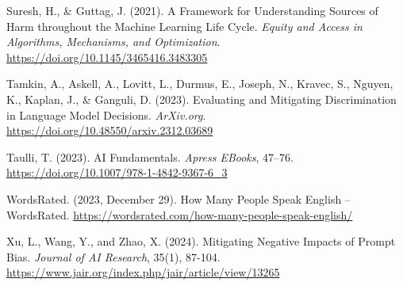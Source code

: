 \documentclass[11pt,twocolumn]{article}
\begin{document}
\begin{thebibliography}{}
Suresh, H., & Guttag, J. (2021).
\newblock A Framework for Understanding Sources of Harm throughout the Machine Learning Life Cycle.
\newblock \textit{Equity and Access in Algorithms, Mechanisms, and Optimization}.
\newblock \url{https://doi.org/10.1145/3465416.3483305}

Tamkin, A., Askell, A., Lovitt, L., Durmus, E., Joseph, N., Kravec, S., Nguyen, K., Kaplan, J., & Ganguli, D. (2023).
\newblock Evaluating and Mitigating Discrimination in Language Model Decisions.
\newblock \textit{ArXiv.org}.
\newblock \url{https://doi.org/10.48550/arxiv.2312.03689}

Taulli, T. (2023).
\newblock AI Fundamentals.
\newblock \textit{Apress EBooks}, 47–76.
\newblock \url{https://doi.org/10.1007/978-1-4842-9367-6_3}

WordsRated. (2023, December 29).
\newblock How Many People Speak English – WordsRated.
\newblock \url{https://wordsrated.com/how-many-people-speak-english/}

Xu, L., Wang, Y., and Zhao, X. (2024).
\newblock Mitigating Negative Impacts of Prompt Bias.
\newblock \textit{Journal of AI Research}, 35(1), 87-104.
\newblock \url{https://www.jair.org/index.php/jair/article/view/13265}

\end{thebibliography}
\end{document}
